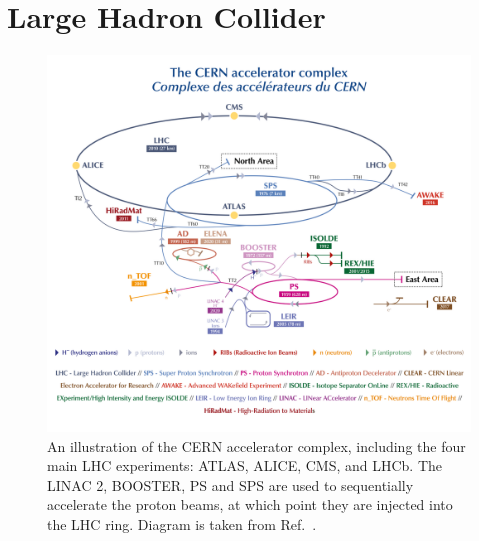 
\section{Large Hadron Collider}\label{sec:lhc}

\begin{figure}[htb!]
  \centering
  \includegraphics[width=1\textwidth]{Figures/cms/cern_accelerator.png}
  \caption[The CERN accelerator complex]
  {
    An illustration of the CERN accelerator complex, including the four main LHC experiments: ATLAS, ALICE, CMS, and LHCb. The LINAC 2, BOOSTER, PS and SPS are used to sequentially accelerate the proton beams, at which point they are injected into the LHC ring. Diagram is taken from Ref.~\cite{Mobs:2684277}.
  }
  \label{fig:cern_accelerator_complex}
\end{figure}

